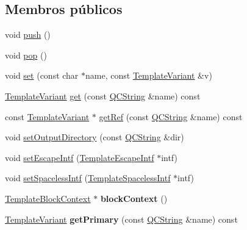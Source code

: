 \subsection*{Membros públicos}
\begin{DoxyCompactItemize}
\item 
void \hyperlink{class_template_context_impl_a98b45e0a7ed122b6710df00209b67827}{push} ()
\item 
void \hyperlink{class_template_context_impl_a312e7f6c761a199c1369fbe651e084f0}{pop} ()
\item 
void \hyperlink{class_template_context_impl_a258e17f8e7e0f12f8cf405976214f489}{set} (const char $\ast$name, const \hyperlink{class_template_variant}{Template\-Variant} \&v)
\item 
\hyperlink{class_template_variant}{Template\-Variant} \hyperlink{class_template_context_impl_a2aac951f4e5ddfe91fc71f55c75730b7}{get} (const \hyperlink{class_q_c_string}{Q\-C\-String} \&name) const 
\item 
const \hyperlink{class_template_variant}{Template\-Variant} $\ast$ \hyperlink{class_template_context_impl_adcff56f208600381453d3dc6af9dd887}{get\-Ref} (const \hyperlink{class_q_c_string}{Q\-C\-String} \&name) const 
\item 
void \hyperlink{class_template_context_impl_ab6895f5081a3cb25b6d9fae349a3d848}{set\-Output\-Directory} (const \hyperlink{class_q_c_string}{Q\-C\-String} \&dir)
\item 
void \hyperlink{class_template_context_impl_aa279b8b31debd1e17e7c37b9630f2e5c}{set\-Escape\-Intf} (\hyperlink{class_template_escape_intf}{Template\-Escape\-Intf} $\ast$intf)
\item 
void \hyperlink{class_template_context_impl_a3c2881415b6438de297c967bd3d6bbc4}{set\-Spaceless\-Intf} (\hyperlink{class_template_spaceless_intf}{Template\-Spaceless\-Intf} $\ast$intf)
\item 
\hypertarget{class_template_context_impl_af87b8640548acba58538bac7af4dd473}{\hyperlink{class_template_block_context}{Template\-Block\-Context} $\ast$ {\bfseries block\-Context} ()}\label{class_template_context_impl_af87b8640548acba58538bac7af4dd473}

\item 
\hypertarget{class_template_context_impl_a90aa1f9cb3d5c7b95cb264a928f9863d}{\hyperlink{class_template_variant}{Template\-Variant} {\bfseries get\-Primary} (const \hyperlink{class_q_c_string}{Q\-C\-String} \&name) const }\label{class_template_context_impl_a90aa1f9cb3d5c7b95cb264a928f9863d}


\end{DoxyCompactItemize}
